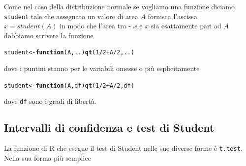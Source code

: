 \documentclass[onecolumn,12pt]{book}\usepackage[]{graphicx}\usepackage[]{color}
\makeatletter
\newcommand{\hlnum}[1]{\textcolor[rgb]{0.686,0.059,0.569}{#1}}%
\newcommand{\hlopt}[1]{\textcolor[rgb]{0,0,0}{#1}}%
\newcommand{\hlstd}[1]{\textcolor[rgb]{0.345,0.345,0.345}{#1}}%
\newcommand{\hlkwa}[1]{\textcolor[rgb]{0.161,0.373,0.58}{\textbf{#1}}}%
\newcommand{\hlkwb}[1]{\textcolor[rgb]{0.69,0.353,0.396}{#1}}%
\newcommand{\hlkwc}[1]{\textcolor[rgb]{0.333,0.667,0.333}{#1}}%
\newcommand{\hlkwd}[1]{\textcolor[rgb]{0.737,0.353,0.396}{\textbf{#1}}}%
\newenvironment{kframe}{%
 \def\at@end@of@kframe{}%
 \ifinner\ifhmode%
  \def\at@end@of@kframe{\end{minipage}}%
  \begin{minipage}{\columnwidth}%
 \fi\fi%
 \def\FrameCommand##1{\hskip\@totalleftmargin \hskip-\fboxsep
 \colorbox{shadecolor}{##1}\hskip-\fboxsep
     \hskip-\linewidth \hskip-\@totalleftmargin \hskip\columnwidth}%
 \MakeFramed {\advance\hsize-\width
   \@totalleftmargin\z@ \linewidth\hsize
   \@setminipage}}%
 {\par\unskip\endMakeFramed%
 \at@end@of@kframe}
\newenvironment{knitrout}{}{} %
\makeatother
\begin{document}
Come nel caso della distribuzione normale se vogliamo una funzione diciamo \texttt{student}  tale che assegnato un valore di area $A$   fornisca l'ascissa $x=student(A)$  in modo che l'area tra - $x$ e $x$ sia esattamente pari ad $A$ dobbiamo scrivere la funzione
\begin{knitrout}
\color{fgcolor}\begin{kframe}
\begin{alltt}
\hlstd{student}\hlkwb{<-}\hlkwa{function} \hlstd{(}\hlkwc{A}\hlstd{,}\hlkwc{..}\hlstd{)} \hlkwd{qt} \hlstd{(}\hlnum{1}\hlopt{/}\hlnum{2} \hlopt{+} \hlstd{A}\hlopt{/}\hlnum{2}\hlstd{,..)}
\end{alltt}
\end{kframe}
\end{knitrout}
dove i puntini stanno per le variabili omesse o pi\`u esplicitamente
\begin{knitrout}
\color{fgcolor}\begin{kframe}
\begin{alltt}
\hlstd{student}\hlkwb{<-}\hlkwa{function} \hlstd{(}\hlkwc{A}\hlstd{,}\hlkwc{df}\hlstd{)} \hlkwd{qt} \hlstd{(}\hlnum{1}\hlopt{/}\hlnum{2} \hlopt{+} \hlstd{A}\hlopt{/}\hlnum{2}\hlstd{,df)}
\end{alltt}
\end{kframe}
\end{knitrout}
dove \texttt{df} sono i gradi di libert\`a. 
 \subsection
{Intervalli di confidenza e test di Student}
La funzione di
\textsf{R} che esegue il test di Student nelle sue diverse forme \`e  \texttt{t.test}.   Nella sua forma pi\`u semplice
\end{document}
